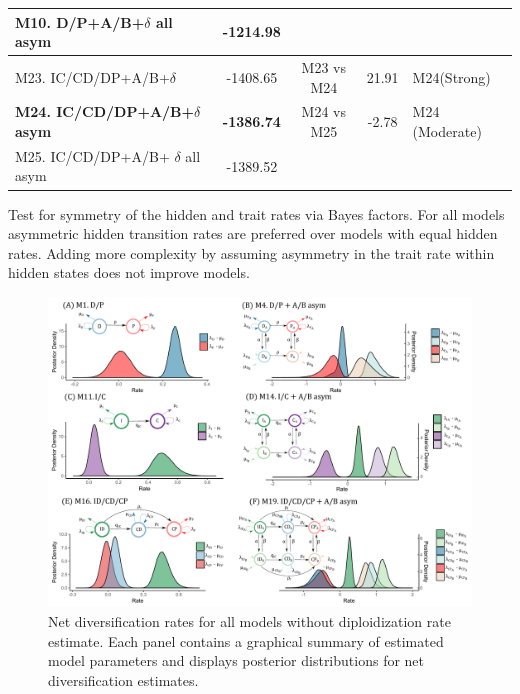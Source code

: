 \begin{supptable}
\begin{tabular}{|l|c|c|c|l|}
M10. D/P+A/B+$\delta$ all asym        & -1214.98                     &                    &                         &                         \\ \hline
M23. IC/CD/DP+A/B+$\delta$                 & -1408.65                     &     M23 vs M24                & 21.91                   & M24(Strong)     \\
\textbf{M24. IC/CD/DP+A/B+$\delta$ asym} & \textbf{-1386.74}                     &   M24 vs M25              & -2.78                   & M24 (Moderate) \\
M25. IC/CD/DP+A/B+ $\delta$ all asym     & -1389.52                     &                     &                         &                         \\ \hline
\end{tabular}
\caption{Test for symmetry of the hidden and trait rates via Bayes factors. For all models asymmetric hidden transition rates are preferred over models with equal hidden rates. Adding more complexity by assuming asymmetry in the trait rate within hidden states does not improve models.}
\label{supptable:asymmetry}
\end{supptable}


\begin{figure}
\includegraphics[width=\textwidth]{alldiversificationasymhidden.pdf} 
\caption{Net diversification rates for all models without diploidization rate estimate. 
Each panel contains a graphical summary of estimated model parameters and displays posterior distributions for net diversification estimates.}
\label{figure:netdivall}
\end{figure}


